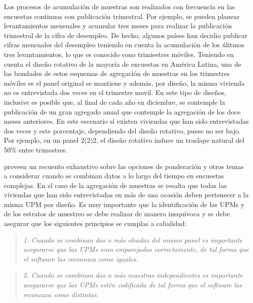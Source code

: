 \documentclass[12pt,spanish,]{book}
\begin{document}
Los procesos de acumulación de muestras son realizados con frecuencia en las encuestas continuas con publicación trimestral. Por ejemplo, se pueden planear levantamientos mensuales y acumular tres meses para realizar la publicación trimestral de la cifra de desempleo. De hecho, algunos países han decidio publicar cifras mensuales del desempleo teniendo en cuenta la acumulación de los úlitmos tres levantamientos, lo que es conocido cono trimiestres móviles. Teniendo en cuenta el diseño rotativo de la mayoría de encuestas en América Latina, una de las bondades de estos esquemas de agregación de muestras en los trimestres móviles es el panel original se mantiene y además, por diseño, la misma vivienda no es entrevistada dos veces en el trimestre movil. En este tipo de diseños, inclusive es posible que, al final de cada año en diciembre, se contemple la publicación de un gran agregado anual que contemple la agregación de los doce meses anteriores. En este escenario sí existen viviendas que han sido entrevistadas dos veces y este porcentaje, dependiendo del diseño rotativo, puese no ser bajo. Por ejemplo, en un panel 2(2)2, el diseño rotativo induce un traslape natural del 50\% entre trimestres.

\textcite[capítulos 7 y 8]{Korn_Graubard_1999} proveen un recuento exhaustivo sobre las opciones de ponderación y otros temas a considerar cuando se combinan datos a lo largo del tiempo en encuestas complejas. En el caso de la agregación de muestras se resalta que todas las viviendas que han sido entrevistadas en más de una ocasión deben pertenecer a la misma UPM por diseño. Es muy importante que la identificación de las UPMs y de los estratos de muestreo se debe realizar de manera inequívoca y se debe asegurar que los siguientes principios se cumplas a cabalidad:

\begin{quote}
\emph{1. Cuando se combinan dos o más oleadas del mismo panel es importante asegurarse que las UPMs sean emparejadas correctamente, de tal forma que el software las reconozca como iguales.}
\end{quote}

\begin{quote}
\emph{2. Cuando se combinan dos o más muestras independientes es importante asegurarse que las UPMs estén codificada de tal forma que el software las reconozca como distintas.}
\end{quote}
\end{document}
